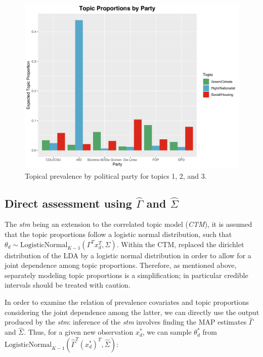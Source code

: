 \begin{figure}[h!]
  \centering
  \captionsetup{justification=centering,margin=2cm}
  \includegraphics[scale = 0.5]{../plots/4_4/quasi_t134_cat.pdf}
  \caption{Topical prevalence by political party for topics 1, 2, and 3.}
  \label{fig:boat1}
\end{figure}

\subsection{Direct assessment using $\hat{\Gamma}$ and $\hat{\Sigma}$}

The \textit{stm} being an extension to the correlated topic model (\textit{CTM}), it is assumed that the topic proportions follow a logistic normal distribution, such that $\theta_d \sim \text{LogisticNormal}_{K-1}(\Gamma^Tx_d^T, \Sigma)$. Within the CTM, \cite{blei2007correlated} replaced the dirichlet distribution of the LDA by a logistic normal distribution in order to allow for a joint dependence among topic proportions. Therefore, as mentioned above, separately modeling topic proportions is a simplification; in particular credible intervals should be treated with caution.

In order to examine the relation of prevalence covariates and topic proportions considering the joint dependence among the latter, we can directly use the output produced by the \textit{stm}: inference of the \textit{stm} involves finding the MAP estimates $\hat{\Gamma}$ and $\hat{\Sigma}$. Thus, for a given new observation $x_d^*$, we can sample $\theta_d^*$ from $\text{LogisticNormal}_{K-1}(\hat{\Gamma}^T(x_d^*)^T, \hat{\Sigma})$:

